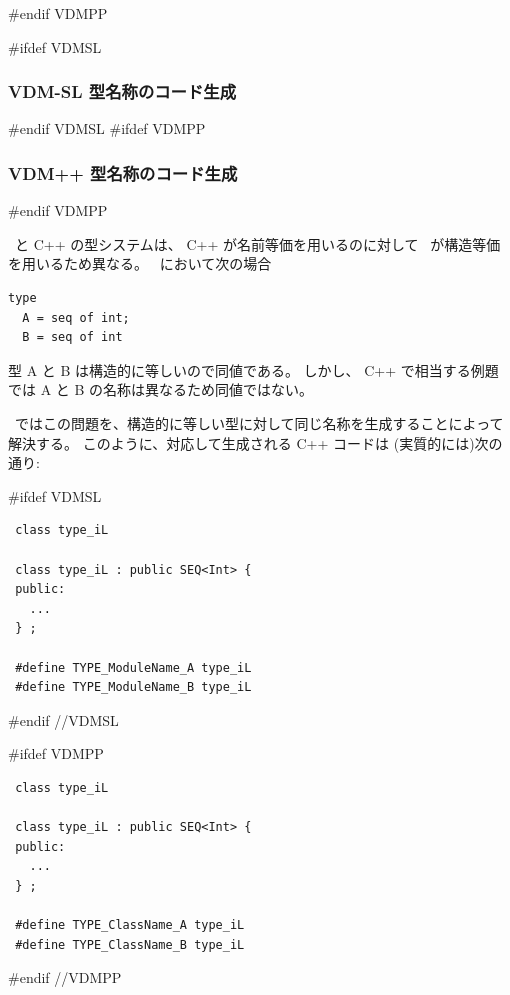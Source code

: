 \documentclass[\pformat,12pt]{jarticle}
\begin{document}
\begin{itemize}
%
%
%
#endif VDMPP

\end{itemize}

#ifdef VDMSL
\subsubsection{VDM-SL 型名称のコード生成}\label{nameconventions}
#endif VDMSL
#ifdef VDMPP
\subsubsection{VDM++ 型名称のコード生成}\label{nameconventions}
#endif VDMPP

 \VDM\ と C++ の型システムは、 C++ が名前等価を用いるのに対して \VDM\ が構造等価を用いるため異なる。 \VDM\ において次の場合
\begin{verbatim}
type                            
  A = seq of int;              
  B = seq of int
\end{verbatim}
型 A と B は構造的に等しいので同値である。 
しかし、 C++ で相当する例題では A と B の名称は異なるため同値ではない。

\Tcg\ ではこの問題を、構造的に等しい型に対して同じ名称を生成することによって解決する。
このように、対応して生成される C++ コードは (実質的には)次の通り:

#ifdef VDMSL
\begin{verbatim}
 class type_iL

 class type_iL : public SEQ<Int> {
 public:
   ...
 } ;

 #define TYPE_ModuleName_A type_iL
 #define TYPE_ModuleName_B type_iL
\end{verbatim}
#endif //VDMSL

#ifdef VDMPP
\begin{verbatim}
 class type_iL

 class type_iL : public SEQ<Int> {
 public:
   ...
 } ;

 #define TYPE_ClassName_A type_iL
 #define TYPE_ClassName_B type_iL
\end{verbatim}
#endif //VDMPP
\end{document}
